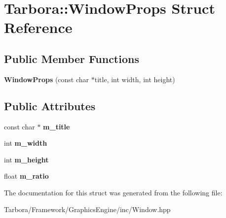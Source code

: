 \hypertarget{structTarbora_1_1WindowProps}{}\section{Tarbora\+:\+:Window\+Props Struct Reference}
\label{structTarbora_1_1WindowProps}
\subsection*{Public Member Functions}
\begin{DoxyCompactItemize}
\item 
\mbox{\label{structTarbora_1_1WindowProps_ac2517c5cba37b0748f81a28701fcc4ad}} 
{\bfseries Window\+Props} (const char $\ast$title, int width, int height)
\end{DoxyCompactItemize}
\subsection*{Public Attributes}
\begin{DoxyCompactItemize}
\item 
\mbox{\label{structTarbora_1_1WindowProps_a1eb5e30895f666b149f4490e5cb2de41}} 
const char $\ast$ {\bfseries m\+\_\+title}
\item 
\mbox{\label{structTarbora_1_1WindowProps_a88d52919332650693b561f60228cb9cf}} 
int {\bfseries m\+\_\+width}
\item 
\mbox{\label{structTarbora_1_1WindowProps_a1e99c0ccd0866616ebdfaabf1a7cb8f6}} 
int {\bfseries m\+\_\+height}
\item 
\mbox{\label{structTarbora_1_1WindowProps_ae9b9513edd88f5300b5e7564260c4b5e}} 
float {\bfseries m\+\_\+ratio}
\end{DoxyCompactItemize}


The documentation for this struct was generated from the following file\+:\begin{DoxyCompactItemize}
\item 
Tarbora/\+Framework/\+Graphics\+Engine/inc/Window.\+hpp\end{DoxyCompactItemize}
